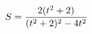 \documentclass[preview]{standalone}
\begin{document}
\begin{align*}
\special{dvisvgm:raw <g id='unique000'>}S=\frac{2(t^2+2)}{(t^2+2)^2-4t^2}\special{dvisvgm:raw </g>}
\end{align*}
\end{document}
